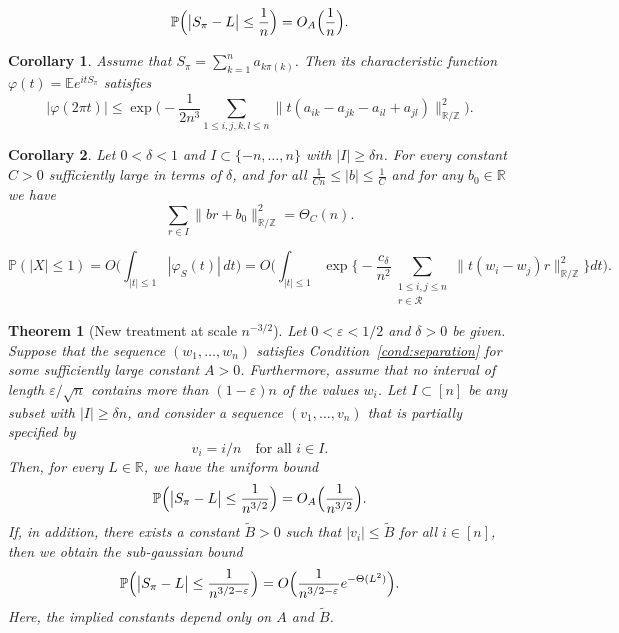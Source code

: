 \documentclass[10pt,a4paper]{amsart}
\newtheorem{theorem}{Theorem}
\newtheorem{corollary}{Corollary}
\newcommand\CR{{\mathcal R}}
\newcommand\E{{\mathbb{E}}}
\renewcommand\P{{\mathbb{P}}}
\newcommand\R{{\mathbb{R}}}
\newcommand\Z{{\mathbb{Z}}}
\newcommand\eps{{\varepsilon}}
\begin{document}
\begin{equation}\label{eqn:1:u}
\P\Bigl(\bigl|S_{\pi}-L\bigr|\le \frac{1}{n}\Bigr)
= O_{A}\Big(\frac{1}{n}\Big).
\end{equation}

\begin{corollary}\label{cor:Roos}
Assume that $S_{\pi} = \sum_{k=1}^{n} a_{k \pi(k)}$.
Then its characteristic function $\varphi(t) = \E e^{it S_{\pi}}$ satisfies
\[
|\varphi(2\pi t)| \le \exp\Big(-\frac{1}{2n^{3}} \sum_{1\le i,j,k,l\le n} \|t (a_{ik} - a_{jk} -a_{il} + a_{jl})\|^2_{\R/\Z}\Big).
\] 
\end{corollary}

\begin{corollary}\label{cor:wraparound} 
Let $0 < \delta < 1$ and $I \subset \{-n,\dots,n\}$ with $|I| \geq \delta n$. For every constant $C > 0$ sufficiently large in terms of $\delta$, and for all $\frac{1}{Cn} \leq |b| \leq \frac{1}{C}$ and for any $b_0 \in \R$ we have
$$\sum_{r \in I} \| b r +b_0 \|_{\R/\Z}^2 =\Theta_{C} (n).$$
\end{corollary}

\begin{equation}\label{eqn:int:1}
\P(|X| \le 1) =O\Big(\int_{|t| \le 1} |\varphi_{S}(t)| \, dt\Big)
=O\Big(\int_{|t| \le 1} \exp\Big\{ -\frac{c_{\delta}}{n^{2}} \sum_{\substack{1 \le i,j \le n \\ r\in \CR}} \| t (w_{i} - w_{j}) r \|_{\R/\Z}^{2} \Big\} dt\Big).
\end{equation}

\begin{theorem}[New treatment at scale $n^{-3/2}$]\label{thm:cont:3/2}
Let $0<\varepsilon<1/2$ and $\delta>0$ be given. Suppose that the sequence
$(w_1,\ldots,w_n)$ satisfies Condition~\ref{cond:separation} for some
sufficiently large constant $A>0$. Furthermore, assume that no interval of
length $\varepsilon/\sqrt{n}$ contains more than $(1-\varepsilon)n$ of the
values $w_i$. Let $I\subset[n]$ be any subset with $|I|\ge \delta n$, and
consider a sequence $(v_1,\ldots,v_n)$ that is partially specified by
\[
v_i = i/n \quad \text{for all } i\in I.
\]
Then, for every $L\in\R$, we have the uniform bound
\begin{equation}\label{eqn:3/2:u}
\P\Bigl(\bigl|S_{\pi}-L\bigr|\le \frac{1}{n^{3/2}}\Bigr)
= O_{A}\Big(\frac{1}{n^{3/2}}\Big).
\end{equation}
If, in addition, there exists a constant $\widetilde{B}>0$ such that
$|v_i|\le \widetilde{B}$ for all $i\in[n]$, then we obtain the sub-gaussian bound
\begin{equation}\label{eqn:3/2:L}
\P\Bigl(\bigl|S_{\pi}-L\bigr|\le \frac{1}{n^{3/2-\eps}}\Bigr)
= O\Big(\frac{1}{n^{3/2-\eps}} e^{-\Theta(L^{2})}\Big).
\end{equation}
Here, the implied constants depend only on $A$ and $\widetilde{B}$.
\end{theorem}
\end{document}
